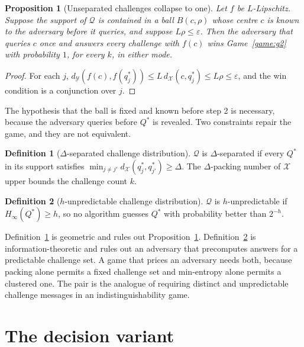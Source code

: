 \documentclass[11pt]{article}
\theoremstyle{definition}
\newtheorem{definition}{Definition}
\theoremstyle{plain}
\newtheorem{proposition}{Proposition}
\newcommand{\X}{\mathcal{X}}
\newcommand{\Y}{\mathcal{Y}}
\newcommand{\Q}{\mathcal{Q}}
\begin{document}
\begin{proposition}[Unseparated challenges collapse to one]
\label{prop:sep}
Let $f$ be $L$-Lipschitz. Suppose the support of $\Q$ is contained in a ball
$B(c,\rho)$ whose centre $c$ is known to the adversary before it queries, and
suppose $L\rho \le \varepsilon$. Then the adversary that queries $c$ once and
answers every challenge with $f(c)$ wins Game~\ref{game:g2} with probability $1$,
for every $k$, in either mode.
\end{proposition}

\begin{proof}
For each $j$, $d_\Y(f(c), f(q^*_j)) \le L\,d_\X(c, q^*_j) \le L\rho \le
\varepsilon$, and the win condition is a conjunction over $j$.
\end{proof}

The hypothesis that the ball is fixed and known before step 2 is necessary, because
the adversary queries before $Q^*$ is revealed. Two constraints repair the game, and
they are not equivalent.

\begin{definition}[$\Delta$-separated challenge distribution]
\label{def:packing}
$\Q$ is $\Delta$-separated if every $Q^*$ in its support satisfies
$\min_{j \ne j'} d_\X(q^*_j, q^*_{j'}) \ge \Delta$. The $\Delta$-packing number of
$\X$ upper bounds the challenge count $k$.
\end{definition}

\begin{definition}[$h$-unpredictable challenge distribution]
\label{def:minent}
$\Q$ is $h$-unpredictable if $H_\infty(Q^*) \ge h$, so no algorithm guesses $Q^*$
with probability better than $2^{-h}$.
\end{definition}

Definition~\ref{def:packing} is geometric and rules out
Proposition~\ref{prop:sep}. Definition~\ref{def:minent} is information-theoretic
and rules out an adversary that precomputes answers for a predictable challenge
set. A game that prices an adversary needs both, because packing alone permits a
fixed challenge set and min-entropy alone permits a clustered one. The pair is the
analogue of requiring distinct and unpredictable challenge messages in an
indistinguishability game.

\section{The decision variant}
\label{sec:ind}
\end{document}
